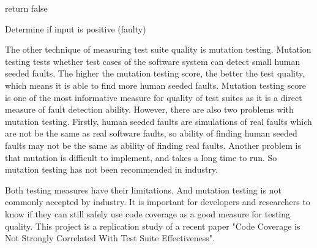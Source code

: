 \begin{algorithm}[h]
	{
		return false\;
	}
	\caption{Determine if input is positive (faulty)}
	\label{algo:faultygreater}
	\bigskip
\end{algorithm}

The other technique of measuring test suite quality is mutation testing. Mutation testing tests whether test cases of the software system can detect small human seeded faults. The higher the mutation testing score, the better the test quality, which means it is able to find more human seeded faults. Mutation testing score is one of the most informative measure for quality of test suites as it is a direct measure of fault detection ability. However, there are also two problems with mutation testing. Firstly, human seeded faults are simulations of real faults which are not be the same as real software faults, so ability of finding human seeded faults may not be the same as ability of finding real faults. Another problem is that mutation is difficult to implement, and takes a long time to run. So mutation testing has not been recommended in industry. 

Both testing measures have their limitations. And mutation testing is not commonly accepted by industry. It is important for developers and researchers to know if they can still safely use code coverage as a good measure for testing quality. This project is a replication study of a recent paper "Code Coverage is Not Strongly Correlated With Test Suite Effectiveness".